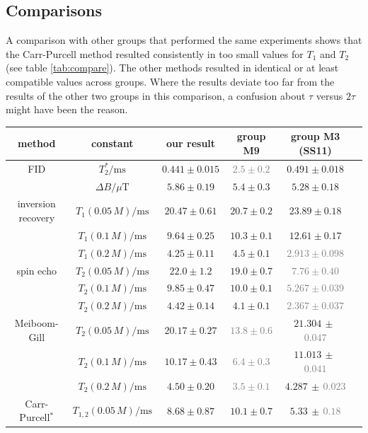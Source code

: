 \documentclass[a4paper]{scrartcl}
\numberwithin{equation}{section}
\numberwithin{figure}{section}
\numberwithin{table}{section}
\begin{document}
\subsection{Comparisons}
A comparison with other groups that performed the same experiments shows that the Carr-Purcell method resulted consistently in too small values for $T_1$ and $T_2$ (see table \ref{tab:compare}). The other methods resulted in identical or at least compatible values across groups. Where the results deviate too far from the results of the other two groups in this comparison, a confusion about $\tau$ versus $2\tau$ might have been the reason.

\begin{table}[!tbh]
\centering
\small
\begin{tabular}{cccccc}
\toprule
method & constant & our result & group M9 & group M3 (SS11) \\
\midrule 
\midrule
FID & $T_2^* / \text{ms}$ & $0.441\pm 0.015$ & \textcolor{Gray}{$2.5\pm 0.2$} & $0.491\pm 0.018$ \\
& $\Delta B / \mu\text{T}$ & $5.86\pm 0.19$ & $5.4\pm 0.3$ & $5.28\pm 0.18$ \\
\midrule
inversion recovery & $T_1(0.05\,M) / \text{ms}$ & $20.47\pm 0.61$ & $20.7\pm 0.2$ & $23.89\pm0.18$ \\
& $T_1(0.1\,M) / \text{ms}$ & $9.64\pm 0.25$ & $10.3\pm 0.1$ & $12.61\pm0.17$ \\
& $T_1(0.2\,M) / \text{ms}$ & $4.25\pm 0.11$ & $4.5\pm 0.1$ & \textcolor{Gray}{$2.913\pm0.098$} \\
\midrule
spin echo & $T_2(0.05\,M) / \text{ms}$ & $22.0\pm 1.2$ & $19.0\pm 0.7$ & \textcolor{Gray}{$7.76\pm 0.40$} \\
& $T_2(0.1\,M) / \text{ms}$ & $9.85\pm 0.47$ & $10.0\pm 0.1$ & \textcolor{Gray}{$5.267\pm 0.039$} \\
& $T_2(0.2\,M) / \text{ms}$ & $4.42\pm 0.14$ & $4.1\pm 0.1$ & \textcolor{Gray}{$2.367\pm0.037$} \\
\midrule
Meiboom-Gill & $T_2(0.05\,M) / \text{ms}$ & $20.17\pm 0.27$ & \textcolor{Gray}{$13.8\pm 0.6$} & $21.304\,\pm\,$\textcolor{Gray}{$0.047$} \\
& $T_2(0.1\,M) / \text{ms}$ & $10.17\pm 0.43$ & \textcolor{Gray}{$6.4\pm 0.3$} & $11.013\,\pm\,$\textcolor{Gray}{$0.041$} \\
& $T_2(0.2\,M) / \text{ms}$ & $4.50\pm 0.20$ & \textcolor{Gray}{$3.5\pm 0.1$} & $4.287\,\pm\,$\textcolor{Gray}{$0.023$} \\
\midrule
Carr-Purcell$^*$ & $T_{1,2}(0.05\,M) / \text{ms}$ & $8.68\pm0.87$ & $10.1\pm 0.7$ & $5.33\,\pm\,$\textcolor{Gray}{$0.18$} \\

\end{tabular}
\end{table}
\end{document}
